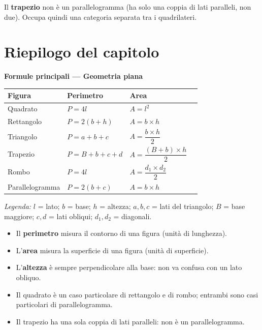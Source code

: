 \begin{attenzione}
    Il \textbf{trapezio} non è un parallelogramma (ha solo una coppia di lati paralleli, non due). Occupa quindi una categoria separata tra i quadrilateri.
\end{attenzione}

\section*{Riepilogo del capitolo}

\begin{regola}
    \textbf{Formule principali — Geometria piana}

    \medskip
    \begin{tabular}{@{}llll@{}}
        \toprule
        \textbf{Figura} & \textbf{Perimetro} & \textbf{Area}                   \\
        \midrule
        Quadrato        & $P = 4l$           & $A = l^2$                       \\[4pt]
        Rettangolo      & $P = 2(b+h)$       & $A = b \times h$                \\[4pt]
        Triangolo       & $P = a+b+c$        & $A = \dfrac{b \times h}{2}$     \\[8pt]
        Trapezio        & $P = B+b+c+d$      & $A = \dfrac{(B+b) \times h}{2}$ \\[8pt]
        Rombo           & $P = 4l$           & $A = \dfrac{d_1 \times d_2}{2}$ \\[8pt]
        Parallelogramma & $P = 2(b+c)$       & $A = b \times h$                \\
        \bottomrule
    \end{tabular}

    \medskip
    \small
    \textit{Legenda:} $l$ = lato; $b$ = base; $h$ = altezza; $a,b,c$ = lati del triangolo;
    $B$ = base maggiore; $c,d$ = lati obliqui; $d_1, d_2$ = diagonali.
\end{regola}

\begin{itemize}[leftmargin=1.5em]
    \item Il \textbf{perimetro} misura il contorno di una figura (unità di lunghezza).
    \item L'\textbf{area} misura la superficie di una figura (unità di superficie).
    \item L'\textbf{altezza} è sempre perpendicolare alla base: non va confusa con un lato obliquo.
    \item Il quadrato è un caso particolare di rettangolo e di rombo; entrambi sono casi particolari di parallelogramma.
    \item Il trapezio ha una sola coppia di lati paralleli: non è un parallelogramma.
\end{itemize}